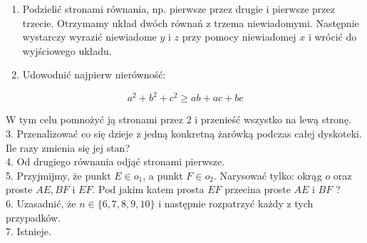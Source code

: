 \documentclass[10pt]{article}
\begin{document}
\begin{enumerate}
  \item Podzielić stronami równania, np. pierwsze przez drugie i pierwsze przez trzecie. Otrzymamy układ dwóch równań z trzema niewiadomymi. Następnie wystarczy wyrazić niewiadome \(y\) i \(z\) przy pomocy niewiadomej \(x\) i wrócić do wyjściowego układu.
  \item Udowodnić najpierw nierówność:
\end{enumerate}

\[
a^{2}+b^{2}+c^{2} \geq a b+a c+b c
\]

W tym celu pomnożyć ją stronami przez 2 i przenieść wszystko na lewą stronę.\\
3. Przenalizować co się dzieje z jedną konkretną żarówką podczas całej dyskoteki. Ile razy zmienia się jej stan?\\
4. Od drugiego równania odjąć stronami pierwsze.\\
5. Przyjmijmy, że punkt \(E \in o_{1}\), a punkt \(F \in o_{2}\). Narysować tylko: okrąg \(o\) oraz proste \(A E, B F\) i \(E F\). Pod jakim katem prosta \(E F\) przecina proste \(A E\) i \(B F\) ?\\
6. Uzasadnić, że \(n \in\{6,7,8,9,10\}\) i następnie rozpatrzyć każdy z tych przypadków.\\
7. Istnieje.
\end{document}
